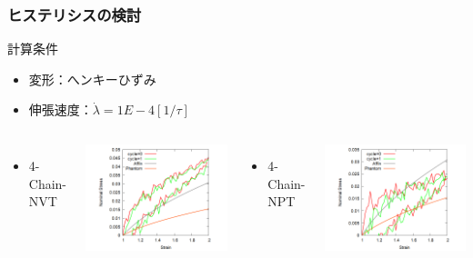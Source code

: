 \documentclass[12pt, dvipdfmx]{beamer}
\begin{document}
\begin{frame}
    \frametitle{ヒステリシスの検討}
        \begin{block}{計算条件}
            \begin{itemize}
                \item 変形：へンキーひずみ
                \item 伸張速度：$\dot{\lambda} = 1E-4 [1/\tau]$
            \end{itemize}
        \end{block}
    \begin{columns}[T, onlytextwidth]
        \begin{itemize}
            \item 4-Chain-NVT
        \end{itemize}
            \includegraphics[width= \textwidth]{hyst_4Chain.png}
        \begin{itemize}
            \item 4-Chain-NPT
        \end{itemize}
            \includegraphics[width=\textwidth]{hyst_NPT_4Chain.png}
    \end{columns}
\end{frame}
\end{document}

